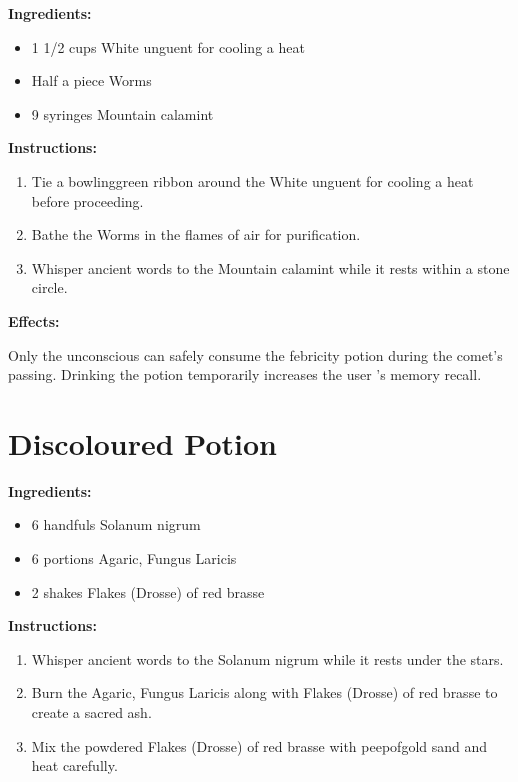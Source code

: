 \documentclass{article}
\begin{document}
\textbf{Ingredients:}

\begin{itemize}
  \item 1 1/2 cups White unguent for cooling a heat
  \item Half a piece Worms
  \item 9 syringes Mountain calamint
\end{itemize}

\textbf{Instructions:}

\begin{enumerate}
  \item Tie a bowlinggreen ribbon around the White unguent for cooling a heat before proceeding.
  \item Bathe the Worms in the flames of air for purification.
  \item Whisper ancient words to the Mountain calamint while it rests within a stone circle.
\end{enumerate}

\textbf{Effects:}

Only the unconscious can safely consume the febricity potion during the comet’s passing. Drinking the potion temporarily increases the user 's memory recall.

\newpage
\section*{Discoloured Potion}

\textbf{Ingredients:}

\begin{itemize}
  \item 6 handfuls Solanum nigrum
  \item 6 portions Agaric, Fungus Laricis
  \item 2 shakes Flakes (Drosse) of red brasse
\end{itemize}

\textbf{Instructions:}

\begin{enumerate}
  \item Whisper ancient words to the Solanum nigrum while it rests under the stars.
  \item Burn the Agaric, Fungus Laricis along with Flakes (Drosse) of red brasse to create a sacred ash.
  \item Mix the powdered Flakes (Drosse) of red brasse with peepofgold sand and heat carefully.
\end{enumerate}
\end{document}
